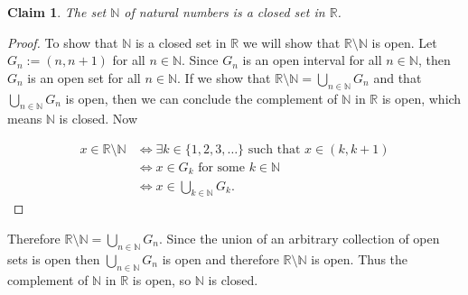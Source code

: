 \documentclass[12pt]{article}
\newtheorem*{claim}{Claim}
\begin{document}
\begin{enumerate}[label=\arabic*., itemsep=1.5cm]
\vspace{0.5cm}

\begin{claim}
The set $\mathbb{N}$ of natural numbers is a closed set in $\mathbb{R}$.
\end{claim}

\begin{proof}
To show that $\mathbb{N}$ is a closed set in $\mathbb{R}$ we will show that $\mathbb{R} \setminus \mathbb{N}$ is open. Let $G_n := (n, n + 1)$ for all $n \in \mathbb{N}$. Since $G_n$ is an open interval for all $n \in \mathbb{N}$, then $G_n$ is an open set for all $n \in \mathbb{N}$. If we show that $\displaystyle \mathbb{R} \setminus \mathbb{N} = \bigcup_{n \in \mathbb{N}} G_n$ and that $\displaystyle \bigcup_{n \in \mathbb{N}} G_n$ is open, then we can conclude the complement of $\mathbb{N}$ in $\mathbb{R}$ is open, which means $\mathbb{N}$ is closed. Now

\begin{equation*}
\begin{split}
x \in \mathbb{R} \setminus \mathbb{N} &\iff \exists k \in \{1, 2, 3, \ldots\} \text{ such that } x \in (k, k + 1) \\
&\iff x \in G_k \text{ for some } k \in \mathbb{N} \\
&\iff x \in \bigcup_{k \in \mathbb{N}} G_k.
\end{split}
\end{equation*}
\end{proof}

Therefore $\displaystyle \mathbb{R} \setminus \mathbb{N} = \bigcup_{n \in \mathbb{N}} G_n$. Since the union of an arbitrary collection of open sets is open then $\displaystyle \bigcup_{n \in \mathbb{N}} G_n$ is open and therefore $\mathbb{R} \setminus \mathbb{N}$ is open. Thus the complement of $\mathbb{N}$ in $\mathbb{R}$ is open, so $\mathbb{N}$ is closed.
\end{enumerate}
\end{document}
